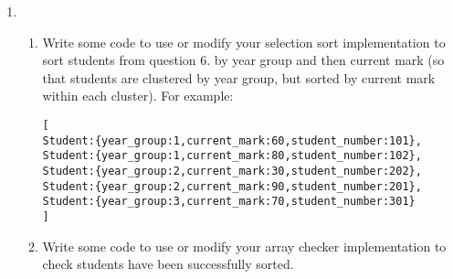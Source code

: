 \documentclass[11pt,a4paper]{report}
\begin{document}
\begin{enumerate}
\item 
    \begin{enumerate}
        \item Write some code to use or modify your selection sort implementation to sort students from question 6. by year group and then current mark (so that students are clustered by year group, but sorted by current mark within each cluster). For example:
\begin{alltt}[
    Student: \{year_group : 1, current_mark: 60, student_number: 101\},
    Student: \{year_group : 1, current_mark: 80, student_number: 102\},
    Student: \{year_group : 2, current_mark: 30, student_number: 202\},
    Student: \{year_group : 2, current_mark: 90, student_number: 201\},
    Student: \{year_group : 3, current_mark: 70, student_number: 301\}
]
\end{alltt}
        \item Write some code to use or modify your array checker implementation to check students have been successfully sorted.
    \end{enumerate} 
        

\end{enumerate}
\end{document}
